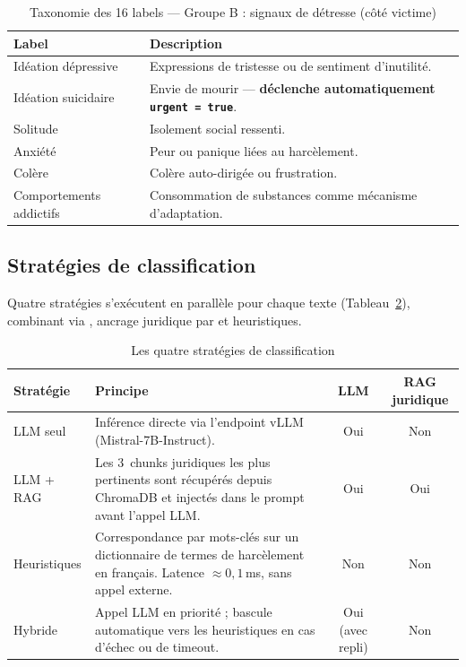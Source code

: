 \vspace{6pt}
\begin{table}[H]
\centering
\caption{Taxonomie des 16 labels — Groupe B : signaux de détresse (côté victime)}
\label{tab:taxonomie_groupeB}
\small
\begin{tabular}{|l|p{9cm}|}
\hline
\textbf{Label} & \textbf{Description} \\
\hline
Idéation dépressive     & Expressions de tristesse ou de sentiment d'inutilité. \\
\hline
Idéation suicidaire     & Envie de mourir — \textbf{déclenche automatiquement \texttt{urgent = true}}. \\
\hline
Solitude                & Isolement social ressenti. \\
\hline
Anxiété                 & Peur ou panique liées au harcèlement. \\
\hline
Colère                  & Colère auto-dirigée ou frustration. \\
\hline
Comportements addictifs & Consommation de substances comme mécanisme d'adaptation. \\
\hline
\end{tabular}
\end{table}

\subsection{Stratégies de classification}
\label{subsec:strategies_classif}

Quatre stratégies s'exécutent en parallèle pour chaque texte (Tableau~\ref{tab:strategies_classif}),
combinant \cite{mistral2023} via \cite{vllm2023}, ancrage juridique par \cite{chromadb} et heuristiques.

\vspace{6pt}
\begin{table}[H]
\centering
\caption{Les quatre stratégies de classification}
\label{tab:strategies_classif}
\begin{tabular}{|l|p{5.5cm}|c|c|}
\hline
\textbf{Stratégie} & \textbf{Principe} & \textbf{LLM} & \textbf{RAG juridique} \\
\hline
LLM seul
  & Inférence directe via l'endpoint vLLM (Mistral-7B-Instruct).
  & Oui & Non \\
\hline
LLM + RAG
  & Les 3~chunks juridiques les plus pertinents sont récupérés depuis ChromaDB
    et injectés dans le prompt avant l'appel LLM.
  & Oui & Oui \\
\hline
Heuristiques
  & Correspondance par mots-clés sur un dictionnaire de termes de harcèlement
    en français. Latence $\approx 0{,}1$\,ms, sans appel externe.
  & Non & Non \\
\hline
Hybride
  & Appel LLM en priorité ; bascule automatique vers les heuristiques
    en cas d'échec ou de timeout.
  & Oui (avec repli) & Non \\
\hline
\end{tabular}
\end{table}

